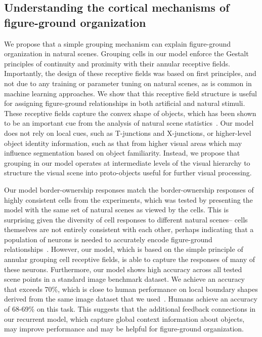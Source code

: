 \documentclass[12pt]{article}
\begin{document}
\subsection{Understanding the cortical mechanisms of figure-ground organization}
We propose that a simple grouping mechanism can explain figure-ground organization in natural scenes. Grouping cells in our model enforce the Gestalt principles of continuity and proximity with their annular receptive fields. Importantly, the design of these receptive fields was based on first principles, and not due to any training or parameter tuning on natural scenes, as is common in machine learning approaches. We show that this receptive field structure is useful for assigning figure-ground relationships in both artificial and natural stimuli. These receptive fields capture the convex shape of objects, which has been shown to be an important cue from the analysis of natural scene statistics~\citep{Sigman_etal01}. Our model does not rely on local cues, such as T-junctions and X-junctions, or higher-level object identity information, such as that from higher visual areas which may influence segmentation based on object familiarity. Instead, we propose that grouping in our model operates at intermediate levels of the visual hierarchy to structure the visual scene into proto-objects useful for further visual processing.

Our model border-ownership responses match the border-ownership responses of highly consistent cells from the experiments, which was tested by presenting the model with the same set of natural scenes as viewed by the cells. This is surprising given the diversity of cell responses to different natural scenes-- cells themselves are not entirely consistent with each other, perhaps indicating that a population of neurons is needed to accurately encode figure-ground relationships~\citep{Hesse_Tsao16}. However, our model, which is based on the simple principle of annular grouping cell receptive fields, is able to capture the responses of many of these neurons.
%
%
Furthermore, our model shows high accuracy across all tested scene points in a standard image benchmark dataset. We achieve an accuracy that exceeds 70\%, which is close to human performance on local boundary shapes derived from the same image dataset that we used~\citep{Fowlkes_etal07}. Humans achieve an accuracy of 68-69\% on this task. This suggests that the additional feedback connections in our recurrent model, which capture global context information about objects, may improve performance and may be helpful for figure-ground organization.
\end{document}
